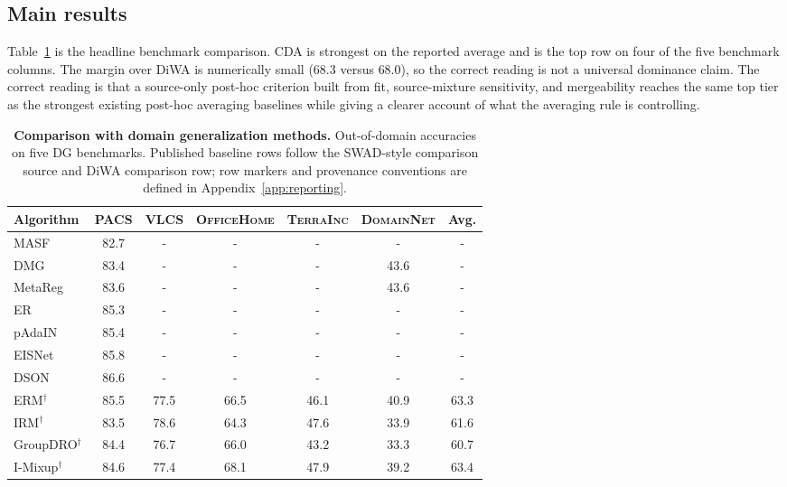 \documentclass{article}
\newcommand{\data}[1]{\textsc{#1}}
\theoremstyle{definition}
\newcommand{\tabfont}{\scriptsize}
\begin{document}
\subsection{Main results}

Table~\ref{tab:full_table_cda} is the headline benchmark comparison. CDA is strongest on the reported average and is the top row on four of the five benchmark columns. The margin over DiWA is numerically small (\(68.3\) versus \(68.0\)), so the correct reading is not a universal dominance claim. The correct reading is that a source-only post-hoc criterion built from fit, source-mixture sensitivity, and mergeability reaches the same top tier as the strongest existing post-hoc averaging baselines while giving a clearer account of what the averaging rule is controlling.

\begin{table}[t]
\centering
\tabfont
\caption{\textbf{Comparison with domain generalization methods.} Out-of-domain accuracies on five DG benchmarks. Published baseline rows follow the SWAD-style comparison source and DiWA comparison row; row markers and provenance conventions are defined in Appendix~\ref{app:reporting}.}
\label{tab:full_table_cda}
\vspace{0.5em}
\setlength{\tabcolsep}{2.7pt}
\renewcommand{\arraystretch}{0.94}
\begin{adjustbox}{max width=\linewidth}
\begin{tabular}{lccccc|c}
\toprule
\textbf{Algorithm} & \data{PACS} & \data{VLCS} & \data{OfficeHome} & \data{TerraInc} & \data{DomainNet} & \textbf{Avg.} \\
\midrule
MASF & 82.7 & - & - & - & - & - \\
DMG & 83.4 & - & - & - & 43.6 & - \\
MetaReg & 83.6 & - & - & - & 43.6 & - \\
ER & 85.3 & - & - & - & - & - \\
pAdaIN & 85.4 & - & - & - & - & - \\
EISNet & 85.8 & - & - & - & - & - \\
DSON & 86.6 & - & - & - & - & - \\
ERM$^\dagger$ & 85.5 & 77.5 & 66.5 & 46.1 & 40.9 & 63.3 \\
IRM$^\dagger$ & 83.5 & 78.6 & 64.3 & 47.6 & 33.9 & 61.6 \\
GroupDRO$^\dagger$ & 84.4 & 76.7 & 66.0 & 43.2 & 33.3 & 60.7 \\
I-Mixup$^\dagger$ & 84.6 & 77.4 & 68.1 & 47.9 & 39.2 & 63.4 \\

\end{tabular}
\end{adjustbox}
\end{table}
\end{document}
